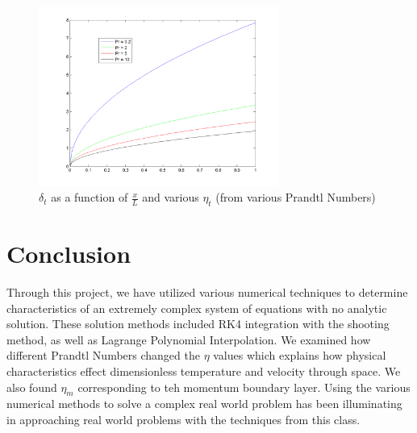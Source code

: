 \documentclass{article}
\begin{document}
\begin{figure}[H]
    \centering
    \includegraphics[width=0.7\textwidth]{deltat.png}
    \caption{$\delta_t$ as a function of $\frac{x}{L}$ and various $\eta_t$ (from various Prandtl Numbers)}
\end{figure}
\section*{Conclusion}
Through this project, we have utilized various numerical techniques to determine characteristics of an extremely complex system of equations with no analytic solution. These solution methods included RK4 integration with the shooting method, as well as Lagrange Polynomial Interpolation. We examined how different Prandtl Numbers changed the $\eta$ values which explains how physical characteristics effect dimensionless temperature and velocity through space. We also found $\eta_m$ corresponding
to teh momentum boundary layer. Using the various numerical methods to solve a complex real world problem has been illuminating in approaching real world problems with the techniques from this class.

\appendix
\end{document}
